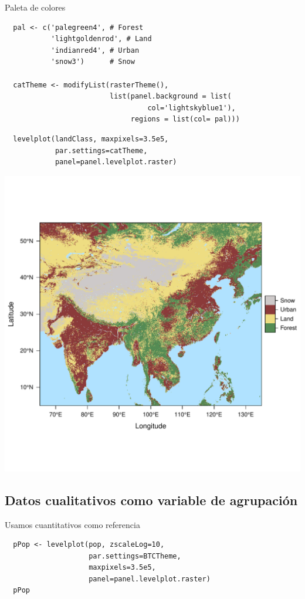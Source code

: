 \documentclass[xcolor={usenames,svgnames,dvipsnames}]{beamer}
\begin{document}
\begin{frame}[fragile,label=sec-3-2-1]{Paleta de colores}
 \lstset{language=R,label= ,caption= ,numbers=none}
\begin{lstlisting}
  pal <- c('palegreen4', # Forest
           'lightgoldenrod', # Land
           'indianred4', # Urban
           'snow3')      # Snow
  
  catTheme <- modifyList(rasterTheme(),
                         list(panel.background = list(
                                  col='lightskyblue1'),
                              regions = list(col= pal)))
\end{lstlisting}
\end{frame}
\begin{frame}[fragile,label=sec-3-2-2]{}
 \lstset{language=R,label= ,caption= ,numbers=none}
\begin{lstlisting}
  levelplot(landClass, maxpixels=3.5e5,
            par.settings=catTheme,
            panel=panel.levelplot.raster)
\end{lstlisting}

\includegraphics[width=.9\linewidth]{figs/landClass.pdf}
\end{frame}

\subsection{Datos cualitativos como variable de agrupación}
\label{sec-3-3}
\begin{frame}[fragile,label=sec-3-3-1]{Usamos cuantitativos como referencia}
 \lstset{language=R,label= ,caption= ,numbers=none}
\begin{lstlisting}
  pPop <- levelplot(pop, zscaleLog=10,
                    par.settings=BTCTheme,
                    maxpixels=3.5e5,
                    panel=panel.levelplot.raster)
  pPop
\end{lstlisting}
\end{frame}
\end{document}
